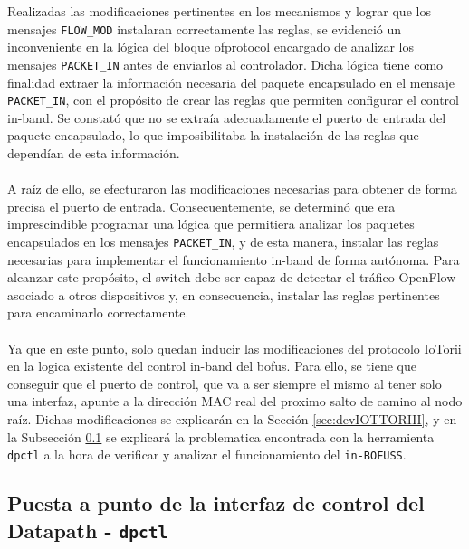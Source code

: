 Realizadas las modificaciones pertinentes en los mecanismos y lograr que los mensajes \texttt{FLOW\_MOD} instalaran correctamente las reglas, se evidenció un inconveniente en la lógica del bloque ofprotocol encargado de analizar los mensajes \texttt{PACKET\_IN} antes de enviarlos al controlador. Dicha lógica tiene como finalidad extraer la información necesaria del paquete encapsulado en el mensaje \texttt{PACKET\_IN}, con el propósito de crear las reglas que permiten configurar el control in-band. Se constató que no se extraía adecuadamente el puerto de entrada del paquete encapsulado, lo que imposibilitaba la instalación de las reglas que dependían de esta información.\\
\\
A raíz de ello, se efecturaron las modificaciones necesarias para obtener de forma precisa el puerto de entrada. Consecuentemente, se determinó que era imprescindible programar una lógica que permitiera analizar los paquetes encapsulados en los mensajes \texttt{PACKET\_IN}, y de esta manera, instalar las reglas necesarias para implementar el funcionamiento in-band de forma autónoma. Para alcanzar este propósito, el switch debe ser capaz de detectar el tráfico OpenFlow asociado a otros dispositivos y, en consecuencia, instalar las reglas pertinentes para encaminarlo correctamente. \\
\\
Ya que en este punto, solo quedan inducir las modificaciones del protocolo IoTorii en la logica existente del control in-band del \gls{bofus}. Para ello, se tiene que conseguir que el puerto de control, que va a ser siempre el mismo al tener solo una interfaz, apunte a la dirección MAC real del proximo salto de camino al nodo raíz. Dichas modificaciones se explicarán en la Sección \ref{sec:devIOTTORIII}, y en la Subsección \ref{sec:dpctl} se explicará la problematica encontrada con la herramienta \texttt{dpctl} a la hora de verificar y analizar el funcionamiento del \texttt{in-BOFUSS}.



\subsection{Puesta a punto de la interfaz de control del Datapath - \texttt{dpctl}}
\label{sec:dpctl}

